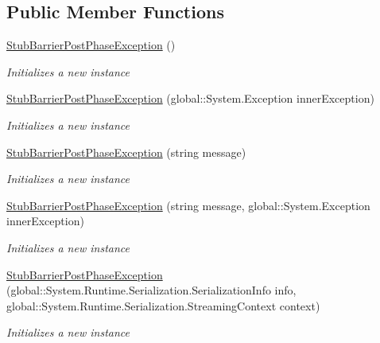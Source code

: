 \subsection*{Public Member Functions}
\begin{DoxyCompactItemize}
\item 
\hyperlink{class_system_1_1_threading_1_1_fakes_1_1_stub_barrier_post_phase_exception_afd4922d3c3cb80c70682b94f0df1e861}{Stub\-Barrier\-Post\-Phase\-Exception} ()
\begin{DoxyCompactList}\small\item\em Initializes a new instance\end{DoxyCompactList}\item 
\hyperlink{class_system_1_1_threading_1_1_fakes_1_1_stub_barrier_post_phase_exception_a827d8689b3dd8b6b84d6eaaafc8efdb4}{Stub\-Barrier\-Post\-Phase\-Exception} (global\-::\-System.\-Exception inner\-Exception)
\begin{DoxyCompactList}\small\item\em Initializes a new instance\end{DoxyCompactList}\item 
\hyperlink{class_system_1_1_threading_1_1_fakes_1_1_stub_barrier_post_phase_exception_a4a5b6e49e2c37616c63ea43d51003220}{Stub\-Barrier\-Post\-Phase\-Exception} (string message)
\begin{DoxyCompactList}\small\item\em Initializes a new instance\end{DoxyCompactList}\item 
\hyperlink{class_system_1_1_threading_1_1_fakes_1_1_stub_barrier_post_phase_exception_adf33a986856bdb052df712fd653f7ff9}{Stub\-Barrier\-Post\-Phase\-Exception} (string message, global\-::\-System.\-Exception inner\-Exception)
\begin{DoxyCompactList}\small\item\em Initializes a new instance\end{DoxyCompactList}\item 
\hyperlink{class_system_1_1_threading_1_1_fakes_1_1_stub_barrier_post_phase_exception_ac4f8ca4dbbd86a0e08a5210bd37c2bc0}{Stub\-Barrier\-Post\-Phase\-Exception} (global\-::\-System.\-Runtime.\-Serialization.\-Serialization\-Info info, global\-::\-System.\-Runtime.\-Serialization.\-Streaming\-Context context)
\begin{DoxyCompactList}\small\item\em Initializes a new instance\end{DoxyCompactList}\item 

\end{DoxyCompactItemize}
